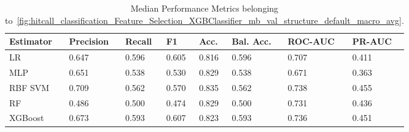 \begin{longtable}{llllllll}
\caption{Median Performance Metrics belonging to~\ref{fig:hitcall_classification_Feature_Selection_XGBClassifier_mb_val_structure_default_macro_avg}.}\label{tab:table:hitcall_classification_feature_selection_xgbclassifier_mb_val_structure_default_macro_avg}\\
\toprule
\midrule
\small Estimator & \small Precision & \small Recall & \small F1 & \small Acc. & \small Bal. Acc. & \small ROC-AUC & \small PR-AUC\\
\hline
LR & 0.647 & 0.596 & 0.605 & 0.816 & 0.596 & 0.707 & 0.411\\
MLP & 0.651 & 0.538 & 0.530 & 0.829 & 0.538 & 0.671 & 0.363\\
RBF SVM & 0.709 & 0.562 & 0.570 & 0.835 & 0.562 & 0.738 & 0.455\\
RF & 0.486 & 0.500 & 0.474 & 0.829 & 0.500 & 0.731 & 0.436\\
XGBoost & 0.673 & 0.593 & 0.607 & 0.823 & 0.593 & 0.736 & 0.451\\
\bottomrule
\end{longtable}